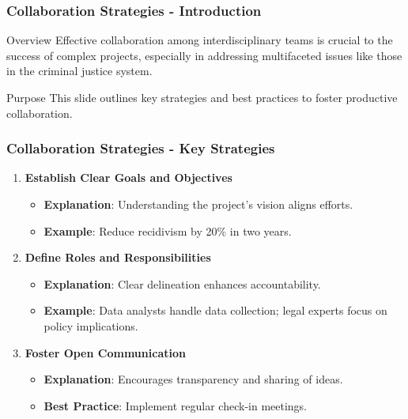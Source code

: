 \documentclass[aspectratio=169]{beamer}
\begin{document}
\begin{frame}[fragile]
    \frametitle{Collaboration Strategies - Introduction}
    \begin{block}{Overview}
        Effective collaboration among interdisciplinary teams is crucial to the success of complex projects, especially in addressing multifaceted issues like those in the criminal justice system.
    \end{block}
    \begin{block}{Purpose}
        This slide outlines key strategies and best practices to foster productive collaboration.
    \end{block}
\end{frame}

\begin{frame}[fragile]
    \frametitle{Collaboration Strategies - Key Strategies}
    \begin{enumerate}
        \item \textbf{Establish Clear Goals and Objectives} 
        \begin{itemize}
            \item \textbf{Explanation}: Understanding the project's vision aligns efforts.
            \item \textbf{Example}: Reduce recidivism by 20\% in two years.
        \end{itemize}

        \item \textbf{Define Roles and Responsibilities} 
        \begin{itemize}
            \item \textbf{Explanation}: Clear delineation enhances accountability.
            \item \textbf{Example}: Data analysts handle data collection; legal experts focus on policy implications.
        \end{itemize}

        \item \textbf{Foster Open Communication} 
        \begin{itemize}
            \item \textbf{Explanation}: Encourages transparency and sharing of ideas.
            \item \textbf{Best Practice}: Implement regular check-in meetings.
        \end{itemize}
    \end{enumerate}
\end{frame}
\end{document}
